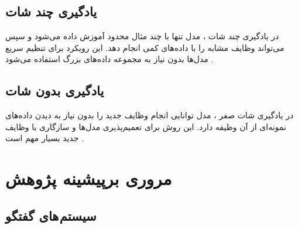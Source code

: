 \subsection{یادگیری چند شات}

در یادگیری چند شات%
، مدل تنها با چند مثال محدود آموزش داده می‌شود و سپس می‌تواند وظایف مشابه را با داده‌های کمی انجام دهد. این رویکرد برای تنظیم سریع مدل‌ها بدون نیاز به مجموعه داده‌های بزرگ استفاده می‌شود %
\cite{chen2023zero}
.

\subsection{یادگیری بدون شات}
در یادگیری شات صفر%
، مدل توانایی انجام وظایف جدید را بدون نیاز به دیدن داده‌های نمونه‌ای از آن وظیفه دارد. این روش برای تعمیم‌پذیری مدل‌ها و سازگاری با وظایف جدید بسیار مهم است %
\cite{chen2023zero}
.



\section{مروری برپیشینه پژوهش}
\label{BackgroundResearch:my}
\subsection{سیستم های گفتگو}

